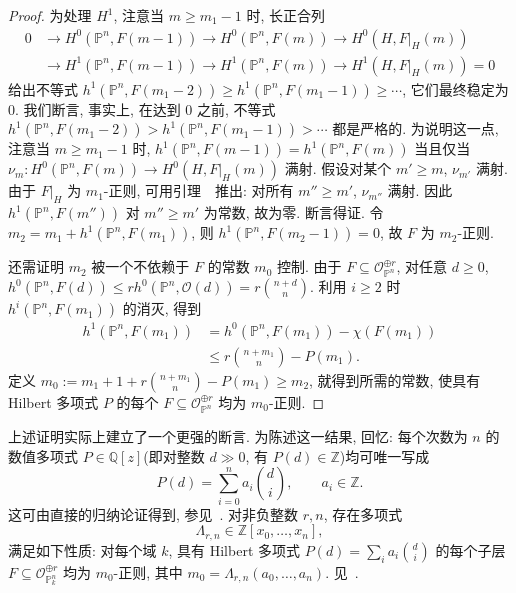\begin{proof}
为处理 $H^1$, 注意当 $m\geq m_1-1$ 时, 长正合列
\begin{equation}\label{src:2.3.11}
\begin{aligned}
0&\longrightarrow H^0(\mathbb P^n,F(m-1))
\longrightarrow H^0(\mathbb P^n,F(m))
\longrightarrow H^0(H,F|_H(m))\\
&\longrightarrow H^1(\mathbb P^n,F(m-1))
\longrightarrow H^1(\mathbb P^n,F(m))
\longrightarrow H^1(H,F|_H(m))=0
\end{aligned}
\end{equation}
给出不等式 $h^1(\mathbb P^n,F(m_1-2))\geq h^1(\mathbb P^n,F(m_1-1))\geq\cdots$, 它们最终稳定为 $0$.
我们断言, 事实上, 在达到 $0$ 之前, 不等式
$h^1(\mathbb P^n,F(m_1-2))>h^1(\mathbb P^n,F(m_1-1))>\cdots$
都是严格的.
为说明这一点, 注意当 $m\geq m_1-1$ 时, 
$h^1(\mathbb P^n,F(m-1))=h^1(\mathbb P^n,F(m))$
当且仅当 $\nu_m:H^0(\mathbb P^n,F(m))\to H^0(H,F|_H(m))$ 满射.
假设对某个 $m'\geq m$, $\nu_{m'}$ 满射.
由于 $F|_H$ 为 $m_1$-正则, 可用引理~~推出: 对所有 $m''\geq m'$, $\nu_{m''}$ 满射.
因此 $h^1(\mathbb P^n,F(m''))$ 对 $m''\geq m'$ 为常数, 故为零.
断言得证. 令 $m_2=m_1+h^1(\mathbb P^n,F(m_1))$, 则
$h^1(\mathbb P^n,F(m_2-1))=0$, 故 $F$ 为 $m_2$-正则.

还需证明 $m_2$ 被一个不依赖于 $F$ 的常数 $m_0$ 控制.
由于 $F\subseteq\mathcal O_{\mathbb P^n}^{\oplus r}$, 对任意 $d\geq0$, 
$h^0(\mathbb P^n,F(d))\leq rh^0(\mathbb P^n,\mathcal O(d))=r\binom{n+d}{n}$.
利用 $i\geq2$ 时 $h^i(\mathbb P^n,F(m_1))$ 的消灭, 得到
\[
\begin{aligned}
h^1(\mathbb P^n,F(m_1))
&=h^0(\mathbb P^n,F(m_1))-\chi(F(m_1))\\
&\leq r\binom{n+m_1}{n}-P(m_1).
\end{aligned}
\]
定义 $m_0:=m_1+1+r\binom{n+m_1}{n}-P(m_1)\geq m_2$, 
就得到所需的常数, 使具有 Hilbert 多项式 $P$ 的每个 $F\subseteq\mathcal O_{\mathbb P^n}^{\oplus r}$ 均为 $m_0$-正则.
\end{proof}
\begin{remark}\label{src:2.3.12}
上述证明实际上建立了一个更强的断言.
为陈述这一结果, 回忆: 每个次数为 $n$ 的数值多项式 $P\in\mathbb Q[z]$(即对整数 $d\gg0$, 有 $P(d)\in\mathbb Z$)均可唯一写成
\[
P(d)=\sum_{i=0}^na_i\binom di,\qquad a_i\in\mathbb Z.
\]
这可由直接的归纳论证得到, 参见~\cite[命题 I.7.3]{Har77}.
对非负整数 $r,n$, 存在多项式
\begin{equation}\label{src:2.3.13}
\Lambda_{r,n}\in\mathbb Z[x_0,\ldots,x_n],
\end{equation}
满足如下性质: 对每个域 $k$, 具有 Hilbert 多项式
$P(d)=\sum_i a_i\binom di$ 的每个子层
$F\subseteq\mathcal O_{\mathbb P_k^n}^{\oplus r}$
均为 $m_0$-正则, 其中 $m_0=\Lambda_{r,n}(a_0,\ldots,a_n)$.
见~\cite[第 $101$ 页]{Mum66a}.
\end{remark}
